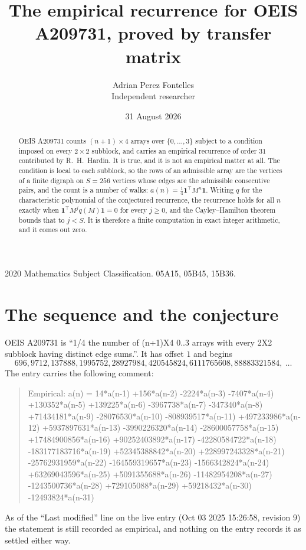 \documentclass[11pt,a4paper]{article}
\title{The empirical recurrence for OEIS A209731, proved by transfer matrix}
\author{Adrian Perez Fontelles\\ \small Independent researcher}
\date{31 August 2026}
\theoremstyle{plain}
\theoremstyle{definition}
\begin{document}
\maketitle

\begin{abstract}
OEIS A209731 counts $(n+1)\times4$ arrays over $\{0,\dots,3\}$ subject to a condition imposed on
every $2\times2$ subblock, and carries an empirical recurrence of order $31$ contributed
by R.~H.~Hardin. It is true, and it is not an empirical matter at all. The condition is local
to each subblock, so the rows of an admissible array are the vertices of a finite digraph
on $S=256$ vertices whose edges are the admissible consecutive pairs, and the count is a
number of walks: $a(n)=\tfrac1{4}\mathbf{1}^{\!\top}M^{n}\mathbf{1}$. Writing $q$
for the characteristic polynomial of the conjectured recurrence, the recurrence holds for all
$n$ exactly when $\mathbf{1}^{\!\top}M^{j}q(M)\mathbf{1}=0$ for every $j\ge0$, and the
Cayley--Hamilton theorem bounds that to $j<S$. It is therefore a finite computation in exact
integer arithmetic, and it comes out zero.
\end{abstract}

\noindent\small 2020 Mathematics Subject Classification. 05A15, 05B45, 15B36.\normalsize

\section{The sequence and the conjecture}

OEIS A209731 is ``1/4 the number of (n+1)X4 0..3 arrays with every 2X2 subblock having distinct edge sums.''. It has offset $1$ and begins
\[
696, 9712, 137888, 1995752, 28927984, 420545824, 6111765608, 88883321584,\ \dots
\]
The entry carries the following comment:
\begin{quote}\small
Empirical: a(n) = 14*a(n-1) +156*a(n-2) -2224*a(n-3) -7407*a(n-4) +130352*a(n-5) +139225*a(n-6) -3967738*a(n-7) -347340*a(n-8) +71434181*a(n-9) -28076530*a(n-10) -808939517*a(n-11) +497233986*a(n-12) +5937897631*a(n-13) -3990226320*a(n-14) -28600057758*a(n-15) +17484900856*a(n-16) +90252403892*a(n-17) -42280584722*a(n-18) -183177183716*a(n-19) +52345388842*a(n-20) +228997243328*a(n-21) -25762931959*a(n-22) -164559319657*a(n-23) -1566342824*a(n-24) +63269043596*a(n-25) +5091355688*a(n-26) -11482954208*a(n-27) -1243500736*a(n-28) +729105088*a(n-29) +59218432*a(n-30) -12493824*a(n-31)
\end{quote}
As of the ``Last modified'' line on the live entry (Oct 03 2025 15:26:58, revision 9) the statement is
still recorded as empirical, and nothing on the entry records it as settled either way.
\end{document}
